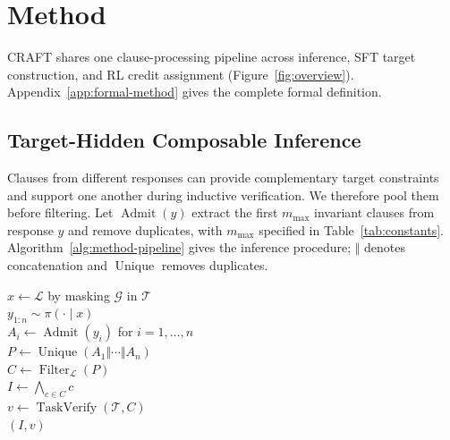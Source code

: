 \section{Method}\label{sec:method}

CRAFT shares one clause-processing pipeline across inference, SFT target
construction, and RL credit assignment (Figure~\ref{fig:overview}).
Appendix~\ref{app:formal-method} gives the complete formal definition.

\subsection{Target-Hidden Composable Inference}
\label{sec:method:core}
\label{sec:method:inference}

Clauses from different responses can provide complementary target
constraints and support one another during inductive verification.
We therefore pool them before filtering.  Let
\(\operatorname{Admit}(y)\) extract the first \(m_{\max}\) invariant clauses
from response \(y\) and remove duplicates, with \(m_{\max}\) specified in
Table~\ref{tab:constants}.  Algorithm~\ref{alg:method-pipeline} gives the
inference procedure; \(\Vert\) denotes concatenation and
\(\operatorname{Unique}\) removes duplicates.

\begin{algorithm}[H]
\caption{Rollout--decompose--pool--filter--compose}
\label{alg:method-pipeline}
\begin{algorithmic}
\algline \(x\leftarrow\mathcal L\) by masking \(\mathcal G\) in \(\mathcal T\)\\
\algline \(y_{1:n}\sim\pi(\cdot\mid x)\)\\
\algline \(A_i\leftarrow\operatorname{Admit}(y_i)\) for \(i=1,\ldots,n\)
  \\
\algline \(P\leftarrow\operatorname{Unique}(A_1\Vert\cdots\Vert A_n)\)
  \\
\algline \(C\leftarrow\operatorname{Filter}_{\mathcal L}(P)\)\\
\algline \(I\leftarrow\bigwedge_{c\in C}c\)\\
\algline \(v\leftarrow\operatorname{TaskVerify}(\mathcal T,C)\)\\
\algline {} \((I,v)\)\\
\end{algorithmic}
\end{algorithm}

